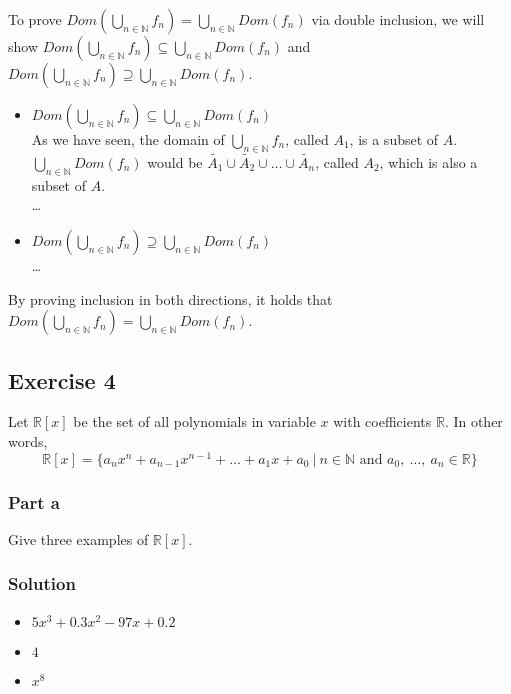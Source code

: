 \documentclass[12pt]{article}
\begin{document}
To prove $Dom(\bigcup\limits_{n \in \mathbb{N}} f_n) = \bigcup\limits_{n \in \mathbb{N}} Dom(f_n)$ via double inclusion, we will show $Dom(\bigcup\limits_{n \in \mathbb{N}} f_n) \subseteq \bigcup\limits_{n \in \mathbb{N}} Dom(f_n)$ and $Dom(\bigcup\limits_{n \in \mathbb{N}} f_n) \supseteq \bigcup\limits_{n \in \mathbb{N}} Dom(f_n)$.
\begin{itemize}
	\item
		$Dom(\bigcup\limits_{n \in \mathbb{N}} f_n) \subseteq \bigcup\limits_{n \in \mathbb{N}} Dom(f_n)$\\
		As we have seen, the domain of $\bigcup\limits_{n \in \mathbb{N}} f_n$, called $A_1$, is a subset of $A$.\\
		$\bigcup\limits_{n \in \mathbb{N}} Dom(f_n)$ would be $\tilde{A_1} \cup \tilde{A_2} \cup \ldots \cup \tilde{A_n}$, called $A_2$, which is also a subset of $A$.\\
		\ldots
	\item
		$Dom(\bigcup\limits_{n \in \mathbb{N}} f_n) \supseteq \bigcup\limits_{n \in \mathbb{N}} Dom(f_n)$\\
		\ldots
\end{itemize}
By proving inclusion in both directions, it holds that $Dom(\bigcup\limits_{n \in \mathbb{N}} f_n) = \bigcup\limits_{n \in \mathbb{N}} Dom(f_n)$.

\pagebreak
\subsection*{Exercise 4}

Let $\mathbb{R}[x]$ be the set of all polynomials in variable $x$ with coefficients $\mathbb{R}$. In other words,
\[
	\mathbb{R}[x] = \{ a_nx^n + a_{n-1}x^{n-1} + \ldots + a_1x + a_0\ |\ n \in \mathbb{N} \text{ and } a_0,\ \ldots,\ a_n \in \mathbb{R} \}
\]

\subsubsection*{Part a}

Give three examples of $\mathbb{R}[x]$.

\subsubsection*{Solution}

\begin{itemize}
	\itemsep0em
	\item $5x^3 + 0.3x^2 - 97x + 0.2$
	\item $4$
	\item $x^8$
\end{itemize}
\end{document}
